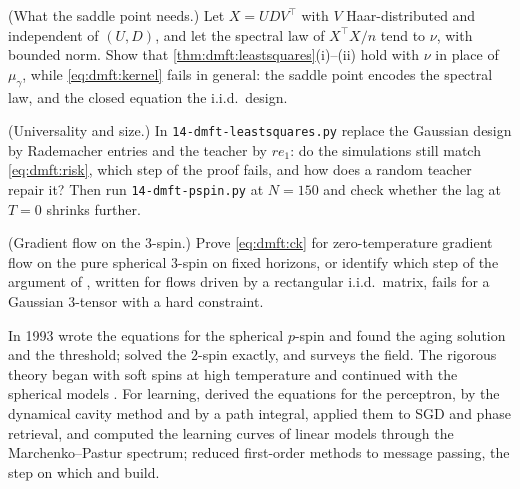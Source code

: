 \begin{refsection}
\begin{exercises}
\item \translate\hard (What the saddle point needs.) Let $X=UDV^\top$ with $V$ Haar-distributed and independent of $(U,D)$, and let the spectral law of $X^\top X/n$ tend to $\nu$, with bounded norm. Show that \cref{thm:dmft:leastsquares}(i)--(ii) hold with $\nu$ in place of $\mu_\gamma$, while \eqref{eq:dmft:kernel} fails in general: the saddle point encodes the spectral law, and the closed equation the i.i.d.\ design. \label{ex:dmft:rotation}

\item \measurement (Universality and size.) In \texttt{14-dmft-leastsquares.py} replace the Gaussian design by Rademacher entries and the teacher by $re_1$: do the simulations still match \eqref{eq:dmft:risk}, which step of the proof fails, and how does a random teacher repair it? Then run \texttt{14-dmft-pspin.py} at $N=150$ and check whether the lag at $T=0$ shrinks further.\label{ex:dmft:universality}

\item \research\harder (Gradient flow on the $3$-spin.) Prove \eqref{eq:dmft:ck} for zero-temperature gradient flow on the pure spherical $3$-spin on fixed horizons, or identify which step of the argument of \textcite{CelentanoChengMontanari2021}, written for flows driven by a rectangular i.i.d.\ matrix, fails for a Gaussian $3$-tensor with a hard constraint.\label{ex:dmft:research}
\end{exercises}

\notesandrefs

In 1993 \textcite{CrisantiHornerSommers1993} wrote the equations for the spherical $p$-spin and \textcite{CugliandoloKurchan1993} found the aging solution and the threshold; \textcite{CugliandoloDean1995} solved the $2$-spin exactly, and \textcite{Cugliandolo2024} surveys the field. The rigorous theory began with soft spins at high temperature \parencite{BenArousGuionnet1997} and continued with the spherical models \parencite{BenArousDemboGuionnet2001,BenArousDemboGuionnet2006,DemboGuionnetMazza2007,Sellke2024}. For learning, \textcite{AgoritsasEtAl2018} derived the equations for the perceptron, by the dynamical cavity method and by a path integral, \textcite{MignaccoEtAl2021a,MignaccoEtAl2021b} applied them to SGD and phase retrieval, and \textcite{AdvaniSaxeSompolinsky2020} computed the learning curves of linear models through the Marchenko--Pastur spectrum; \textcite{CelentanoMontanariWu2020} reduced first-order methods to message passing, the step on which \textcite{GerbelotEtAl2024} and \textcite{CelentanoChengMontanari2021} build.


\end{refsection}

